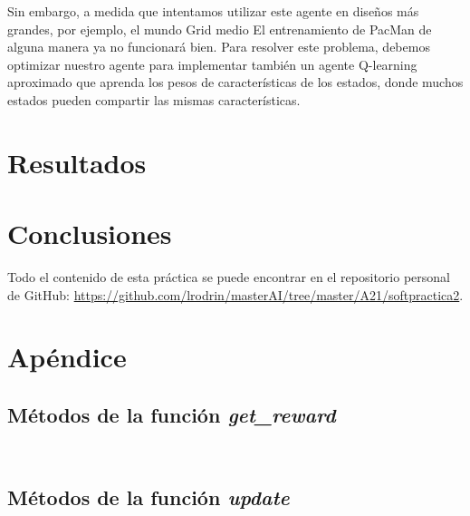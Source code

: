 \documentclass[11pt]{exam}
\begin{document}
Sin embargo, a medida que intentamos utilizar este agente en diseños más grandes, por ejemplo, el mundo Grid medio
El entrenamiento de PacMan de alguna manera ya no funcionará bien. Para resolver este problema, debemos
optimizar nuestro agente para implementar también un agente Q-learning aproximado que aprenda los pesos de
características de los estados, donde muchos estados pueden compartir las mismas características.

\section{Resultados}\label{resultados}

\section{Conclusiones}\label{conclusiones}

Todo el contenido de esta práctica se puede encontrar en el repositorio personal de GitHub: \url{https://github.com/lrodrin/masterAI/tree/master/A21/softpractica2}.

\section{Apéndice}\label{apendice}

\subsection{Métodos de la función \textit{get\_reward}}

\begin{lstlisting}[language=python, basicstyle=\footnotesize]
	
\end{lstlisting}

\subsection{Métodos de la función \textit{update}}

\begin{lstlisting}[language=python, basicstyle=\footnotesize]
	
\end{lstlisting}
\end{document}
